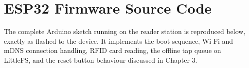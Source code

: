 \chapter{ESP32 Firmware Source Code}
\label{app:firmware}

The complete Arduino sketch running on the reader station is reproduced below, exactly as flashed to the device. It implements the boot sequence, Wi-Fi and mDNS connection handling, RFID card reading, the offline tap queue on LittleFS, and the reset-button behaviour discussed in Chapter 3.


